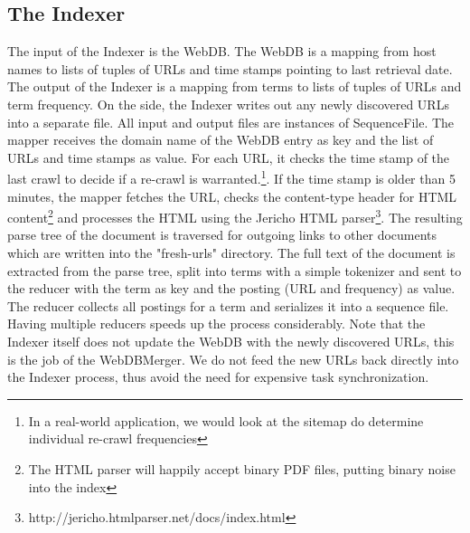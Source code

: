 \documentclass[10pt,a4paper]{report}
\begin{document}
\subsection*{The Indexer}
The input of the Indexer is the WebDB. The WebDB is a mapping from host names to lists of tuples of URLs and time stamps pointing to last retrieval date. The output of the Indexer is a mapping from terms to lists of tuples of URLs and term frequency. On the side, the Indexer writes out any newly discovered URLs into a separate file. All input and output
files are instances of SequenceFile.
The mapper receives the domain name of the WebDB entry as key and the list of URLs and time stamps as value. For each URL, it checks the time stamp of the last crawl
to decide if a re-crawl is warranted.\footnote{In a real-world application, we would look at the sitemap do determine individual re-crawl frequencies}. If the time stamp is older
than 5 minutes, the mapper fetches the URL, checks the content-type header for HTML content\footnote{The HTML parser will happily accept binary PDF files, putting binary noise into the index} and processes the HTML using the Jericho HTML parser\footnote{http://jericho.htmlparser.net/docs/index.html}. The resulting parse tree of the document is traversed for
outgoing links to other documents which are written into the "fresh-urls" directory. The full text of the document is extracted from the parse tree, split into terms with a
simple tokenizer and sent to the reducer with the term as key and the posting (URL and frequency) as value. The reducer collects all postings for a term and serializes it into a sequence file. Having multiple reducers speeds up the process considerably. Note that the Indexer itself does not update the WebDB with the newly discovered URLs, this is the job
of the WebDBMerger. We do not feed the new URLs back directly into the Indexer process, thus avoid the need for expensive task synchronization.
\end{document}

